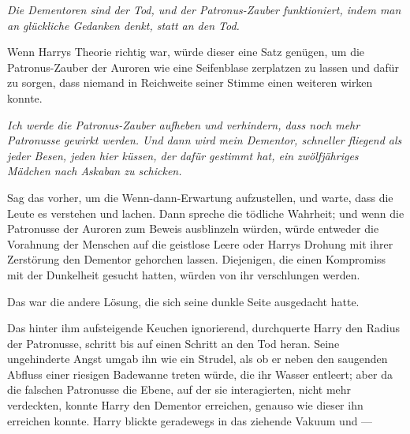 \emph{Die Dementoren sind der Tod, und der Patronus-Zauber funktioniert, indem man an glückliche Gedanken denkt, statt an den Tod.}

Wenn Harrys Theorie richtig war, würde dieser eine Satz genügen, um die Patronus-Zauber der Auroren wie eine Seifenblase zerplatzen zu lassen und dafür zu sorgen, dass niemand in Reichweite seiner Stimme einen weiteren wirken konnte.

\emph{Ich werde die Patronus-Zauber aufheben und verhindern, dass noch mehr Patronusse gewirkt werden. Und dann wird mein Dementor, schneller fliegend als jeder Besen, jeden hier küssen, der dafür gestimmt hat, ein zwölfjähriges Mädchen nach Askaban zu schicken.}

Sag das vorher, um die Wenn-dann-Erwartung aufzustellen, und warte, dass die Leute es verstehen und lachen. Dann spreche die tödliche Wahrheit; und wenn die Patronusse der Auroren zum Beweis ausblinzeln würden, würde entweder die Vorahnung der Menschen auf die geistlose Leere oder Harrys Drohung mit ihrer Zerstörung den Dementor gehorchen lassen. Diejenigen, die einen Kompromiss mit der Dunkelheit gesucht hatten, würden von ihr verschlungen werden.

Das war die andere Lösung, die sich seine dunkle Seite ausgedacht hatte.

Das hinter ihm aufsteigende Keuchen ignorierend, durchquerte Harry den Radius der Patronusse, schritt bis auf einen Schritt an den Tod heran. Seine ungehinderte Angst umgab ihn wie ein Strudel, als ob er neben den saugenden Abfluss einer riesigen Badewanne treten würde, die ihr Wasser entleert; aber da die falschen Patronusse die Ebene, auf der sie interagierten, nicht mehr verdeckten, konnte Harry den Dementor erreichen, genauso wie dieser ihn erreichen konnte. Harry blickte geradewegs in das ziehende Vakuum und —

